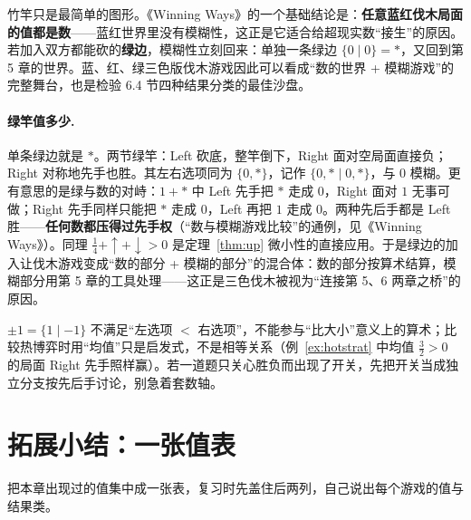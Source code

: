 \documentclass[UTF8,a4paper,11pt,oneside,openany,fontset=fandol]{ctexbook}
\theoremstyle{definition}
\begin{document}
竹竿只是最简单的图形。《Winning Ways》的一个基础结论是：\textbf{任意蓝红伐木局面的值都是数}——蓝红世界里没有模糊性，这正是它适合给超现实数“接生”的原因。若加入双方都能砍的\textbf{绿边}，模糊性立刻回来：单独一条绿边 $\{0\mid 0\}=\ast$，又回到第 5 章的世界。蓝、红、绿三色版伐木游戏因此可以看成“数的世界 + 模糊游戏”的完整舞台，也是检验 6.4 节四种结果分类的最佳沙盘。

\paragraph{绿竿值多少.} 单条绿边就是 $\ast$。两节绿竿：Left 砍底，整竿倒下，Right 面对空局面直接负；Right 对称地先手也胜。其左右选项同为 $\{0,\ast\}$，记作 $\{0,\ast\mid 0,\ast\}$，与 $0$ 模糊。更有意思的是绿与数的对峙：$1+\ast$ 中 Left 先手把 $\ast$ 走成 $0$，Right 面对 $1$ 无事可做；Right 先手同样只能把 $\ast$ 走成 $0$，Left 再把 $1$ 走成 $0$。两种先后手都是 Left 胜——\textbf{任何数都压得过先手权}（“数与模糊游戏比较”的通例，见《Winning Ways》）。同理 $\tfrac14+\uparrow+\downarrow>0$ 是定理~\ref{thm:up} 微小性的直接应用。于是绿边的加入让伐木游戏变成“数的部分 + 模糊的部分”的混合体：数的部分按算术结算，模糊部分用第 5 章的工具处理——这正是三色伐木被视为“连接第 5、6 两章之桥”的原因。

\begin{pitfall}[开关不是数]
$\pm1=\{1\mid -1\}$ 不满足“左选项 $<$ 右选项”，不能参与“比大小”意义上的算术；比较热博弈时用“均值”只是启发式，不是相等关系（例~\ref{ex:hotstrat} 中均值 $\tfrac32>0$ 的局面 Right 先手照样赢）。若一道题只关心胜负而出现了开关，先把开关当成独立分支按先后手讨论，别急着套数轴。
\end{pitfall}

\section{拓展小结：一张值表}
把本章出现过的值集中成一张表，复习时先盖住后两列，自己说出每个游戏的值与结果类。
\end{document}
